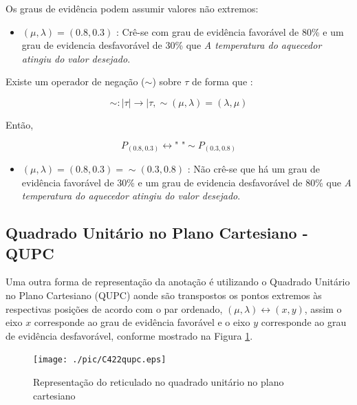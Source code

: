 Os graus de evidência podem assumir valores não extremos:

\begin{itemize}
\item 
$(\mu, \lambda ) = (0.8,0.3)$ : Crê-se com grau de evidência favorável de 80\% e um grau de evidencia desfavorável de 30\%  que \emph{A temperatura do aquecedor atingiu do valor desejado}.
\end{itemize}

Existe um operador de negação ($\sim $) sobre $\tau$ de forma que :
\begin{center}
\begin{equation}
\sim  : \mid \tau \mid \rightarrow \mid \tau , \sim(\mu, \lambda ) = (\lambda, \mu )
\end{equation}
\end{center}

Então,
\begin{center}
\begin{equation}
P_{(0.8,0.3)} \leftrightarrow \textrm{"   "} \sim P_{(0.3,0.8)}
\end{equation}
\end{center}

\begin{itemize}
\item 
$(\mu, \lambda ) = (0.8,0.3) = \sim (0.3,0.8)$ : Não crê-se que há um grau de evidência favorável de 30\% e um grau de evidencia desfavorável de 80\% que \emph{A temperatura do aquecedor atingiu do valor desejado}.
\end{itemize}



\subsection{Quadrado Unitário no Plano Cartesiano - QUPC}

Uma outra forma de representação da anotação é utilizando o Quadrado Unitário no Plano Cartesiano (QUPC) aonde são transpostos os pontos extremos às respectivas posições de acordo com o par ordenado,  $(\mu, \lambda ) \leftrightarrow (x,y) $, assim o eixo $x$ corresponde ao grau de evidência favorável e o eixo $y$ corresponde ao grau de evidência desfavorável, conforme mostrado na Figura \ref{fig:reticuladoQUPC}.



\begin{figure}[!htb]
\center\texttt{[image: ./pic/C422qupc.eps]}
\caption{Representação do reticulado no quadrado unitário no plano cartesiano}
\label{fig:reticuladoQUPC}
\end{figure}

